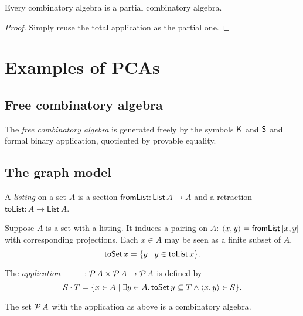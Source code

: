 \begin{proposition}
  \label{prop:CAisPCA}
  \leanok
  Every combinatory algebra is a partial combinatory algebra.
\end{proposition}

\begin{proof}
  \leanok
  Simply reuse the total application as the partial one.
\end{proof}

\section{Examples of PCAs}

\subsection{Free combinatory algebra}
\label{sec:freeCA}

\begin{definition}
  \label{def:FreeCA}
  \leanok
  The \emph{free combinatory algebra} is generated freely by the symbols $\mathsf{K}$ and $\mathsf{S}$ and formal binary application, quotiented by provable equality.
\end{definition}

\subsection{The graph model}
\label{sec:graph-model}

\begin{definition}
  \label{def:Listing}
  \leanok
  A \emph{listing} on a set $A$ is a section $\mathsf{fromList} : \mathsf{List}\,A \to A$ and a retraction $\mathsf{toList} : A \to \mathsf{List}\,A$.
\end{definition}

Suppose $A$ is a set with a listing. It induces a pairing on $A$: $\langle x, y \rangle = \mathsf{fromList}\,[x,y]$ with corresponding projections. Each $x \in A$ may be seen as a finite subset of $A$,
%
\begin{equation*}
  \mathsf{toSet}\,x = \{y \mid y \in \mathsf{toList}\,x\}.
\end{equation*}


\begin{definition}
  \label{def:graph-model-application}
  \leanok
  The \emph{application} ${-} \cdot {-} : \mathcal{P}\,A \times \mathcal{P}\,A \to \mathcal{P}\,A$ is defined by
  \begin{equation*}
    S \cdot T = \{x \in A \mid \exists y \in A.\, \mathsf{toSet}\,y \subseteq T \land \langle x,y \rangle \in S\}.
  \end{equation*}
\end{definition}

\begin{theorem}
  \label{thm:graph-model}
  \leanok
  The set $\mathcal{P}\,A$ with the application as above is a combinatory algebra.
\end{theorem}


